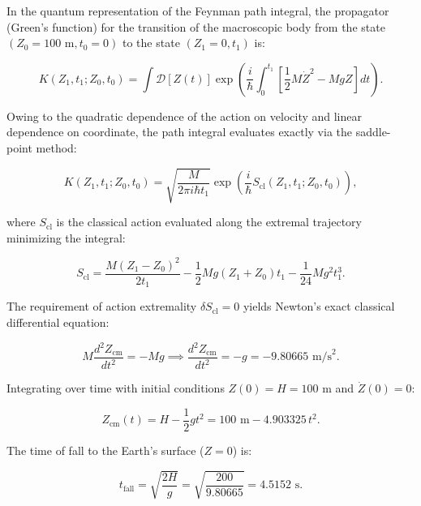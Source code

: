 In the quantum representation of the Feynman path integral, the propagator (Green's function) for the transition of the macroscopic body from the state $(Z_0 = 100\text{ m}, t_0 = 0)$ to the state $(Z_1 = 0, t_1)$ is:

\begin{equation}\label{eq:5.21}\tag{5.21}
K(Z_1, t_1; Z_0, t_0) = \int \mathcal{D}[Z(t)] \exp\left( \frac{i}{\hbar} \int_0^{t_1} \left[ \frac{1}{2} M \dot{Z}^2 - M g Z \right] dt \right).
\end{equation}

Owing to the quadratic dependence of the action on velocity and linear dependence on coordinate, the path integral evaluates exactly via the saddle-point method:

\begin{equation}\label{eq:5.22}\tag{5.22}
K(Z_1, t_1; Z_0, t_0) = \sqrt{\frac{M}{2\pi i \hbar t_1}} \exp\left( \frac{i}{\hbar} S_{\text{cl}}(Z_1, t_1; Z_0, t_0) \right),
\end{equation}

where $S_{\text{cl}}$ is the classical action evaluated along the extremal trajectory minimizing the integral:

\begin{equation}\label{eq:5.23}\tag{5.23}
S_{\text{cl}} = \frac{M (Z_1 - Z_0)^2}{2 t_1} - \frac{1}{2} M g (Z_1 + Z_0) t_1 - \frac{1}{24} M g^2 t_1^3.
\end{equation}

The requirement of action extremality $\delta S_{\text{cl}} = 0$ yields Newton's exact classical differential equation:

\begin{equation}\label{eq:5.24}\tag{5.24}
M \frac{d^2 Z_{\text{cm}}}{dt^2} = - M g \implies \frac{d^2 Z_{\text{cm}}}{dt^2} = - g = - 9.80665\text{ m/s}^2.
\end{equation}

Integrating over time with initial conditions $Z(0) = H = 100\text{ m}$ and $\dot{Z}(0) = 0$:

\begin{equation}\label{eq:5.25}\tag{5.25}
Z_{\text{cm}}(t) = H - \frac{1}{2} g t^2 = 100\text{ m} - 4.903325\,t^2.
\end{equation}

The time of fall to the Earth's surface ($Z = 0$) is:

\begin{equation}\label{eq:5.26}\tag{5.26}
t_{\text{fall}} = \sqrt{\frac{2 H}{g}} = \sqrt{\frac{200}{9.80665}} = 4.5152\text{ s}.
\end{equation}

